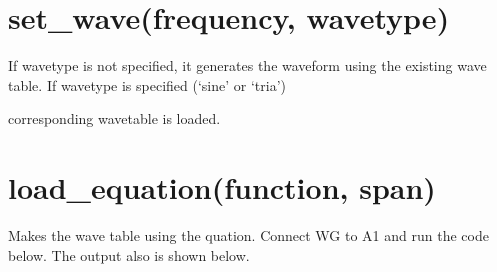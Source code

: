 \documentclass[a4paper,12pt,english]{sphinxmanual}
\begin{document}
\section{set\_wave(frequency, wavetype)}
\label{\detokenize{9.0:set-wave-frequency-wavetype}}
If wavetype is not specified, it generates the waveform using the
existing wave table. If wavetype is specified (‘sine’ or ‘tria’)

corresponding wavetable is loaded.

\begin{sphinxVerbatim}[commandchars=\\\{\}]
   
 
       
   
   
   
\end{sphinxVerbatim}


\section{load\_equation(function, span)}
\label{\detokenize{9.0:load-equation-function-span}}
Makes the wave table using the quation. Connect WG to A1 and run the
code below. The output also is shown below.
\end{document}
